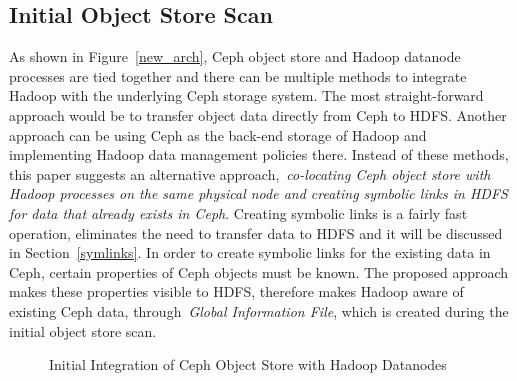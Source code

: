 \documentclass[preprint,12pt]{elsarticle}
\begin{document}
\subsection{Initial Object Store Scan}
\label{initial_data_scan}
As shown in Figure~\ref{new_arch}, Ceph object store and Hadoop datanode processes are
tied together and there can be multiple methods to integrate Hadoop with the underlying Ceph storage system.
The most straight-forward approach would be to transfer object data directly from Ceph to HDFS.
Another approach can be using Ceph as the back-end storage of Hadoop and implementing
Hadoop data management policies there. Instead of these methods, this paper suggests
an alternative approach,~\textit{co-locating Ceph object store with Hadoop processes
on the same physical node and creating symbolic links in HDFS for data that already exists in
Ceph}. Creating symbolic links is a fairly fast operation, eliminates the need to transfer
data to HDFS and it will be discussed in Section~\ref{symlinks}. In order to create symbolic
links for the existing data in Ceph, certain properties of Ceph objects must be known. The
proposed approach makes these properties visible to HDFS, therefore makes Hadoop aware of
existing Ceph data, through~\textit{Global Information File}, which is created during the initial object store scan.

\begin{figure}[!htbp]
\centering
{}
\caption{Initial Integration of Ceph Object Store with Hadoop Datanodes}
\label{initial_scan}
\end{figure}
\end{document}
